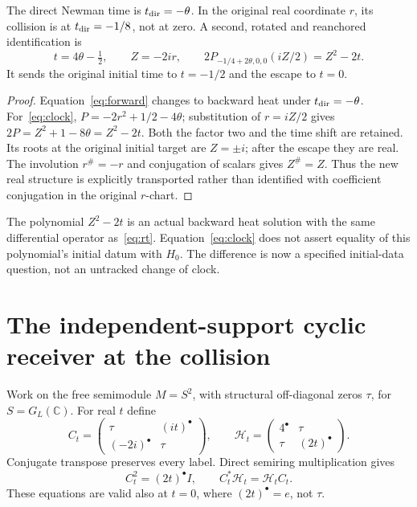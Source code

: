 \documentclass[11pt,a4paper]{article}
\theoremstyle{definition}\newtheorem{definition}[theorem]{Definition}\newtheorem{remark}[theorem]{Remark}
\newcommand{\C}{\mathbb C}\newcommand{\R}{\mathbb R}\newcommand{\Z}{\mathbb Z}\newcommand{\B}{\mathbb B}
\begin{document}
\begin{proposition}
The direct Newman time is $t_{\rm dir}=-\theta$. In the original real coordinate $r$, its collision is at $t_{\rm dir}=-1/8$, not at zero. A second, rotated and reanchored identification is
\begin{equation}
 t=4\theta-\tfrac12,\qquad Z=-2ir,\qquad
 2P_{-1/4+2\theta,0,0}(iZ/2)=Z^2-2t.                   \label{eq:clock}
\end{equation}
It sends the original initial time to $t=-1/2$ and the escape to $t=0$.
\end{proposition}
\begin{proof}
Equation~\eqref{eq:forward} changes to backward heat under $t_{\rm dir}=-\theta$. For~\eqref{eq:clock}, $P=-2r^2+1/2-4\theta$; substitution of $r=iZ/2$ gives $2P=Z^2+1-8\theta=Z^2-2t$. Both the factor two and the time shift are retained. Its roots at the original initial target are $Z=\pm i$; after the escape they are real. The involution $r^\#=-r$ and conjugation of scalars gives $Z^\#=Z$. Thus the new real structure is explicitly transported rather than identified with coefficient conjugation in the original $r$-chart.
\end{proof}
The polynomial $Z^2-2t$ is an actual backward heat solution with the same differential operator as~\eqref{eq:rt}. Equation~\eqref{eq:clock} does not assert equality of this polynomial's initial datum with $H_0$. The difference is now a specified initial-data question, not an untracked change of clock.

\section{The independent-support cyclic receiver at the collision}\label{sec:cyclic}
Work on the free semimodule $M=S^2$, with structural off-diagonal zeros $\tau$, for $S=G_L(\C)$. For real $t$ define
\begin{equation}
 C_t=\begin{pmatrix}\tau&(it)^\bullet\\(-2i)^\bullet&\tau\end{pmatrix},
 \qquad \mathcal H_t=\begin{pmatrix}4^\bullet&\tau\\\tau&(2t)^\bullet\end{pmatrix}.
                                                        \label{eq:cyclic}
\end{equation}
Conjugate transpose preserves every label. Direct semiring multiplication gives
\begin{equation}
 C_t^2=(2t)^\bullet I,\qquad C_t^*\mathcal H_t=\mathcal H_tC_t.
                                                        \label{eq:cycliclaws}
\end{equation}
These equations are valid also at $t=0$, where $(2t)^\bullet=e$, not $\tau$.
\end{document}
